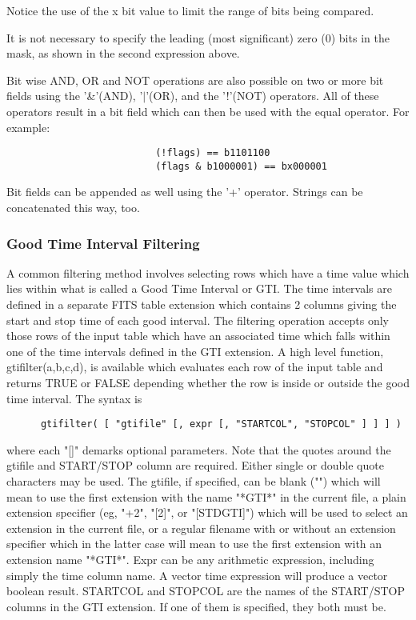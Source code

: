 \documentclass[11pt]{article}
\begin{document}
Notice the use of the x bit value to limit the range of  bits  being
compared.

It  is  not necessary to specify the leading (most significant) zero
(0) bits in the mask, as shown in the second expression above.

Bit wise AND, OR and NOT operations are  also  possible  on  two  or
more  bit  fields  using  the  '\&'(AND),  '$|$'(OR),  and the '!'(NOT)
operators. All of these operators result in a bit  field  which  can
then be used with the equal operator. For example:

 
\begin{verbatim}
                          (!flags) == b1101100
                          (flags & b1000001) == bx000001
\end{verbatim}

Bit  fields can be appended as well using the '+' operator.  Strings
can be concatenated this way, too.

\subsubsection{Good Time Interval Filtering}

    A common filtering method involves selecting rows which have a time
    value which lies within what is called a Good Time Interval or GTI.
    The time intervals are defined in a separate FITS table extension
    which contains 2 columns giving the start and stop time of each
    good interval.  The filtering operation accepts only those rows of
    the input table which have an associated time which falls within
    one of the time intervals defined in the GTI extension. A high
    level function, gtifilter(a,b,c,d), is available which evaluates
    each row of the input table  and returns TRUE  or FALSE depending
    whether the row is inside or outside the  good time interval.  The
    syntax is
 
\begin{verbatim}
      gtifilter( [ "gtifile" [, expr [, "STARTCOL", "STOPCOL" ] ] ] )
\end{verbatim}
    where  each "[]" demarks optional parameters.  Note that  the quotes
    around the gtifile and START/STOP column are required.  Either single
    or double quote characters may be used.  The gtifile,
    if specified,  can be blank  ("") which will  mean to use  the first
    extension  with   the name "*GTI*"  in   the current  file,  a plain
    extension  specifier (eg, "+2",  "[2]", or "[STDGTI]") which will be
    used  to  select  an extension  in  the current  file, or  a regular
    filename with or without an extension  specifier which in the latter
    case  will mean to  use the first  extension  with an extension name
    "*GTI*".  Expr can be   any arithmetic expression, including  simply
    the time  column  name.  A  vector  time expression  will  produce a
    vector boolean  result.  STARTCOL and  STOPCOL are the  names of the
    START/STOP   columns in the    GTI extension.  If   one  of them  is
    specified, they both  must be.
\end{document}

